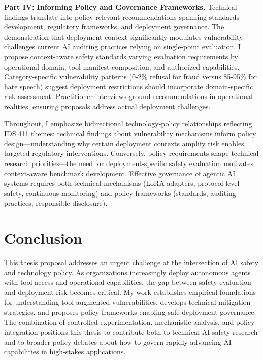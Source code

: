 \documentclass[10pt]{article}
\begin{document}
\textbf{Part IV: Informing Policy and Governance Frameworks.} Technical findings translate into policy-relevant recommendations spanning standards development, regulatory frameworks, and deployment governance. The demonstration that deployment context significantly modulates vulnerability challenges current AI auditing practices relying on single-point evaluation. I propose context-aware safety standards varying evaluation requirements by operational domain, tool manifest composition, and authorized capabilities. Category-specific vulnerability patterns (0-2\% refusal for fraud versus 85-95\% for hate speech) suggest deployment restrictions should incorporate domain-specific risk assessment. Practitioner interviews ground recommendations in operational realities, ensuring proposals address actual deployment challenges.

Throughout, I emphasize bidirectional technology-policy relationships reflecting IDS.411 themes: technical findings about vulnerability mechanisms inform policy design—understanding why certain deployment contexts amplify risk enables targeted regulatory interventions. Conversely, policy requirements shape technical research priorities—the need for deployment-specific safety evaluation motivates context-aware benchmark development. Effective governance of agentic AI systems requires both technical mechanisms (LoRA adapters, protocol-level safety, continuous monitoring) and policy frameworks (standards, auditing practices, responsible disclosure).

\section*{Conclusion}

This thesis proposal addresses an urgent challenge at the intersection of AI safety and technology policy. As organizations increasingly deploy autonomous agents with tool access and operational capabilities, the gap between safety evaluation and deployment risk becomes critical. My work establishes empirical foundations for understanding tool-augmented vulnerabilities, develops technical mitigation strategies, and proposes policy frameworks enabling safe deployment governance. The combination of controlled experimentation, mechanistic analysis, and policy integration positions this thesis to contribute both to technical AI safety research and to broader policy debates about how to govern rapidly advancing AI capabilities in high-stakes applications.
\end{document}
